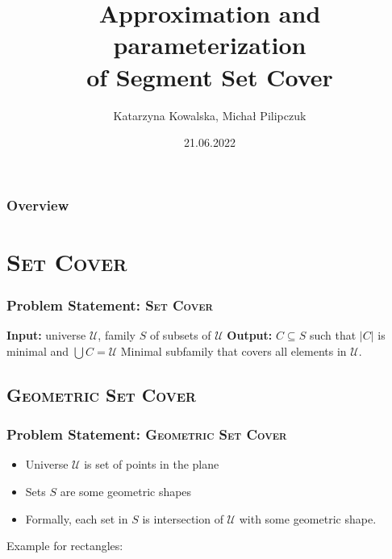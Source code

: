 \documentclass{beamer}
\title[Segment Set Cover]{Approximation and parameterization\\
of Segment Set Cover}
\author{Katarzyna Kowalska, Michał Pilipczuk} %
\institute[UW] %
{
University of Warsaw, MIMUW \\ %
\medskip
\textit{kk371053@students.mimuw.edu.pl} %
}
\date{21.06.2022} %
\begin{document}
\begin{frame}
\titlepage %
\end{frame}

\begin{frame}
\frametitle{Overview} %
\tableofcontents %
\end{frame}



\section{\textsc{Set Cover}}
\begin{frame}
\frametitle{Problem Statement: \textsc{Set Cover}}
\textbf{Input:} universe $\mathcal{U}$,
family $S$ of subsets of $\mathcal{U}$
\newline
\textbf{Output:} $C \subseteq S$ such that $|C|$ is minimal and
$\bigcup C = \mathcal{U}$
\newline
Minimal subfamily that covers all elements in $\mathcal{U}$.

\begin{center}

\end{center}

\end{frame}
\subsection{\textsc{Geometric Set Cover}}

\begin{frame}
\frametitle{Problem Statement: \textsc{Geometric Set Cover}}
\begin{itemize}
\item Universe $\mathcal{U}$ is set of points in the plane
\item Sets $S$ are some geometric shapes
\item Formally, each set in $S$ is intersection of $\mathcal{U}$
with some geometric shape.
\end{itemize}

Example for rectangles:




\end{frame}
\end{document}
